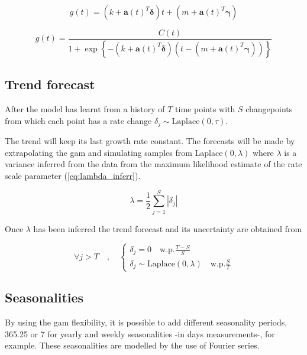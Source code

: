 \begin{equation}\label{eq:piece_trend}
	g(t) = \left( k + \bm{a}(t)^T \bm{\delta} \right)t + \left( m + \bm{a}(t)^T \bm{\gamma} \right)
\end{equation}

\begin{equation}\label{eq:piece_satgrowth}
	g(t) = \frac{C(t)}
	        {1 + \exp\left\{-(k+\bm{a}(t)^T\bm{\delta})(t-(m+\bm{a}(t)^T \bm{\gamma}))\right\}
	        }
\end{equation}


\subsection{Trend forecast}


After the model has learnt from a history of $T$ time points with $S$ changepoints from which each point has a rate change $\delta_j \sim \text{Laplace}(0,\tau)$. 

The trend will keep its last growth rate constant. The forecasts will be made by extrapolating the \ac{gam} and simulating samples from Laplace$(0,\lambda)$ where $\lambda$ is a variance inferred from the data from the maximum likelihood estimate of the rate scale parameter (\ref{eq:lambda_inferr}).

\begin{equation}\label{eq:lambda_inferr}
	\lambda = \frac{1}{2} \sum_{j=1}^{S}{|\delta_j|}
\end{equation}

Once $\lambda$ has been inferred the trend forecast and its uncertainty are obtained from

\begin{equation}\label{eq:trend_forecast}
\forall j > T\quad,\quad 
	\begin{cases}
		\delta_j = 0 \quad \text{w.p.} \frac{T-S}{S} \\
		\delta_j \sim \text{Laplace}(0,\lambda) \quad \text{w.p.} \frac{S}{T}
	\end{cases}
\end{equation}

\pagebreak
\subsection{Seasonalities}

By using the \ac{gam} flexibility, it is possible to add different seasonality periods, 365.25 or 7 for yearly and weekly seasonalities -in days measurements-, for example. These seasonalities are modelled by the use of Fourier series\cite{harvey_fourier}.

